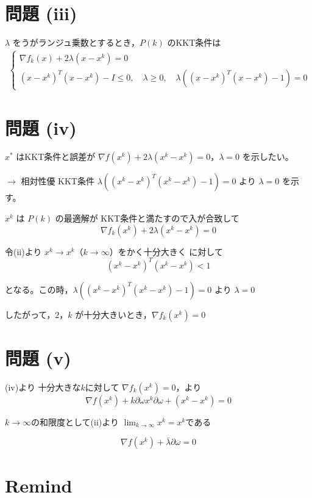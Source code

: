 \documentclass[12pt,a4paper]{article}
\begin{document}
\section*{問題 (iii)}

$\lambda$ をうがランジュ乗数とするとき，$P(k)$ のKKT条件は
\begin{align}
\begin{cases}
\nabla f_k(x) + 2\lambda(x - x^k) = 0 \\
(x - x^k)^T(x - x^k) - I \leq 0, \quad \lambda \geq 0, \quad \lambda((x - x^k)^T(x - x^k) - 1) = 0
\end{cases}
\tag{★}
\end{align}

\section*{問題 (iv)}

$x^*$ はKKT条件と誤差が $\nabla f(x^k) + 2\lambda(x^k - x^k) = 0$，$\lambda = 0$ を示したい。

$\rightarrow$ 相対性優 KKT条件 $\lambda((x^k - x^k)^T(x^k - x^k) - 1) = 0$ より $\lambda = 0$ を示す。

$x^k$ は $P(k)$ の最適解が KKT条件と満たすので入が合致して
\[\nabla f_k(x^k) + 2\lambda(x^k - x^k) = 0\]

令(ii)より $x^k \to x^k$（$k \to \infty$）をかく十分大きく に対して 
\[(x^k - x^k)^T(x^k - x^k) < 1\]

となる。この時，$\lambda((x^k - x^k)^T(x^k - x^k) - 1) = 0$ より $\lambda = 0$

したがって，$2$，$k$ が十分大きいとき，$\nabla f_k(x^k) = 0$

\section*{問題 (v)}

(iv)より 十分大きな$k$に対して $\nabla f_k(x^k) = 0$，より
\[\nabla f(x^k) + k \partial \omega x^k \partial \omega + (x^k - x^k) = 0\]

$k \to \infty$の和限度として(ii)より $\lim_{k \to \infty} x^k = x^k$である

\[\nabla f(x^k) + \bar{\lambda} \partial \omega = 0\]

\newpage

\section*{Remind}
\end{document}
